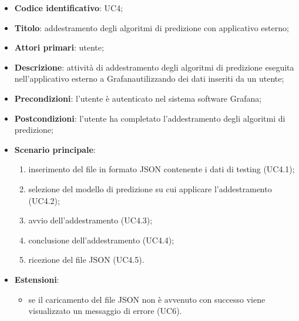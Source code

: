 \begin{itemize}
    \item \textbf{Codice identificativo}: UC4;
    \item \textbf{Titolo}: addestramento degli algoritmi di predizione con applicativo esterno;
    \item \textbf{Attori primari}: utente;
    \item \textbf{Descrizione}: attività di addestramento degli algoritmi di predizione eseguita nell'applicativo esterno a Grafana\glosp utilizzando dei dati inseriti da un utente;
    \item \textbf{Precondizioni}: l'utente è autenticato nel sistema software Grafana\glo;
    \item \textbf{Postcondizioni}: l'utente ha completato l'addestramento degli algoritmi di predizione;
    \item \textbf{Scenario principale}: 
        \begin{enumerate}
            \item inserimento del file in formato JSON contenente i dati di testing (UC4.1);
            \item selezione del modello di predizione su cui applicare l'addestramento (UC4.2);
            \item avvio dell'addestramento (UC4.3);
            \item conclusione dell'addestramento (UC4.4);
            \item ricezione del file JSON (UC4.5). 
        \end{enumerate}
    \item \textbf{Estensioni}:
    \begin{itemize}
    	\item se il caricamento del file JSON non è avvenuto con successo viene visualizzato un messaggio di errore (UC6).
    \end{itemize}
\end{itemize}

